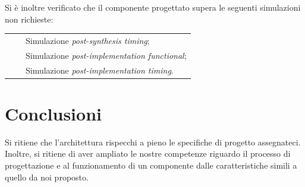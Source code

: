 \documentclass{article}
\newcommand{\tabitem}{~~\llap{\textbullet}~~}
\begin{document}
Si è inoltre verificato che il componente progettato supera le seguenti simulazioni non richieste:\par
\def\arraystretch{1.3} %
\begin{tabular}{m{8cm}}
    \tabitem Simulazione \emph{post-synthesis timing}; \\
    \tabitem Simulazione \emph{post-implementation functional}; \\
    \tabitem Simulazione \emph{post-implementation timing}. \\
\end{tabular}\vspace{1cm}

\section{Conclusioni}
Si ritiene che l’architettura rispecchi a pieno le specifiche di progetto assegnateci. Inoltre, si ritiene di aver ampliato le nostre competenze riguardo il processo di progettazione e al funzionamento di un componente dalle caratteristiche simili a quello da noi proposto.
\end{document}
